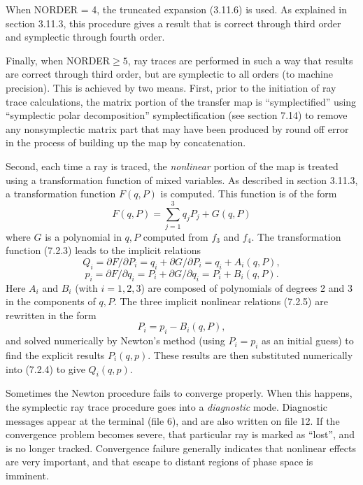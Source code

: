      When NORDER = 4, the truncated expansion (3.11.6) is used.  As
explained in section 3.11.3, this procedure gives a result that is correct
through third order and symplectic through fourth order.

     Finally, when NORDER$\geq 5$, ray traces are performed in such a way that
results are correct through third order, but are symplectic to all orders
(to machine precision).  This is achieved by two means.  First, prior to
the initiation of ray trace calculations, the matrix portion of the
transfer map is ``symplectified'' using ``symplectic polar decomposition''
symplectification (see section 7.14) to remove any nonsymplectic matrix part that
may have been produced by round off error in the process of building up the
map by concatenation.

Second, each time a ray is traced, the {\em nonlinear} portion of the map is treated using a transformation function of mixed
variables.  As described in section 3.11.3, a transformation function
$F(q,P)$ is computed.     This function is of the form
\begin{equation}
F(q,P) = \sum^3_{j=1} q_j P_j + G(q,P)
\end{equation}
where $G$ is a polynomial in $q,P$ computed from $f_3$ and $f_4$.  The
transformation function (7.2.3) leads to the implicit relations
\begin{equation}
Q_i = \partial F/\partial P_i = q_i + \partial G/\partial P_i = q_i +
A_i(q,P),
\end{equation}
\begin{equation}
p_i = \partial F/\partial q_i = P_i + \partial G/\partial q_i = P_i +
B_i(q,P).
\end{equation}
Here $A_i$ and $B_i$ (with $i = 1,2,3$) are composed of polynomials of
degrees 2 and 3 in the components of $q,P$.  The three implicit nonlinear
relations (7.2.5) are rewritten in the form
\begin{equation}
P_i = p_i - B_i(q,P),
\end{equation}
and solved numerically by Newton's method (using $P_i = p_i$ as an
initial guess) to find the explicit results $P_i(q,p)$.  These results
are then substituted numerically into (7.2.4) to give $Q_i(q,p)$.

Sometimes the Newton procedure fails to converge properly.  When this
happens, the symplectic ray trace procedure goes into a {\em diagnostic } mode.
Diagnostic messages appear at the terminal (file 6), and are also written
on file 12.  If the convergence problem becomes severe, that particular ray is
marked as ``lost'', and is no longer tracked.  Convergence failure
generally indicates that nonlinear effects are very important, and that
escape to distant regions of phase space is imminent.

